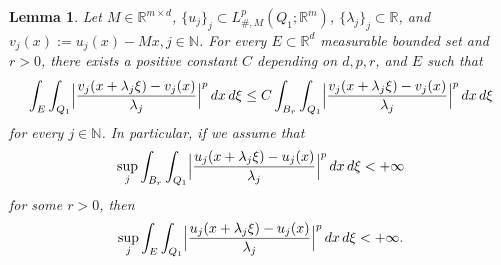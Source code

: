 \documentclass{article}
\newtheorem{lemma}{Lemma}[section]
\theoremstyle{definition}
\newcommand{\N}{\mathbb{N}}
\newcommand{\R}{\mathbb{R}}
\begin{document}
\begin{lemma}\label{lemma : diadic} Let $M\in \R^{m\times d}$, $\{u_j\}_j\subset L^p_{\#,M}(Q_1; \R^m)$, $\{\lambda_j\}_j\subset\R$, and $v_j(x):=u_j(x)-Mx, j\in\N$. For every $E\subset \R^d$ measurable bounded set and $r>0$, there exists a positive constant $C$ depending on $d,p, r$, and $E$ such that
    \begin{equation*}
         \int_{E} \int_{Q_1}\Bigl|\frac{v_j(x+\lambda_j\xi)-v_j(x)}{\lambda_j}\Bigr|^p \, dx\,d\xi \leq C \int_{B_{r}} \int_{Q_1}\Bigl|\frac{v_j(x+\lambda_j\xi)-v_j(x)}{\lambda_j}\Bigr|^p \, dx\,d\xi
    \end{equation*}
    for every $j\in\N$. In particular, if we assume that  
    \begin{equation*}
        \sup_{j}  \int_{B_{r}} \int_{Q_1}\Bigl|\frac{u_j(x+\lambda_j\xi)-u_j(x)}{\lambda_j}\Bigr|^p \, dx\,d\xi <+\infty
    \end{equation*}
    for some $r>0$, then
\begin{equation*}
        \sup_{j}  \int_{E} \int_{Q_1}\Bigl|\frac{u_j(x+\lambda_j\xi)-u_j(x)}{\lambda_j}\Bigr|^p \, dx\,d\xi <+\infty.
    \end{equation*}
    \end{lemma}
\end{document}
